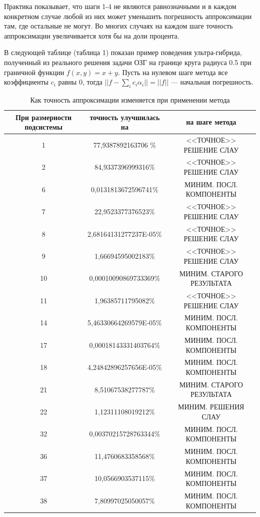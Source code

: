 \documentclass[a4paper, 12pt]{article}
\begin{document}
Практика показывает, что шаги 1-4 не являются равнозначными и в каждом конкретном случае любой из них может уменьшить погрешность аппроксимации там, где остальные не могут.
Во многих случаях на каждом шаге точность аппроксимации увеличивается хотя бы на доли процента.

В следующей таблице (таблица 1) показан пример поведения ультра-гибрида, полученный из реального решения задачи ОЗГ на границе круга радиуса 0.5 при граничной функции $f(x,y)=x+y$.
Пусть на нулевом шаге метода все коэффициенты $c_i$ равны 0, тогда $||f-\sum_i c_i \alpha_i||=||f||$ --- начальная погрешность.

\begin{table}[h]
 
  \label{tabl}
  \caption{Как точность аппроксимации изменяется при применении метода}
\begin{center}
\begin{tabular}[t]{|c|c|c|}
  \hline
  При размерности подсистемы & точность улучшилась на & на шаге метода \\
  \hline
  1 & 77,9387892163706 \% & <<ТОЧНОЕ>> РЕШЕНИЕ СЛАУ \\
  2 & 84,9337396999316\% & <<ТОЧНОЕ>> РЕШЕНИЕ СЛАУ\\
6& 0,0131813672596741\% &МИНИМ. ПОСЛ. КОМПОНЕНТЫ\\
7& 22,9523377376523\% &<<ТОЧНОЕ>> РЕШЕНИЕ СЛАУ\\
8& 2,68164131277237E-05\% &<<ТОЧНОЕ>> РЕШЕНИЕ СЛАУ \\
9& 1,66694595002183\% &<<ТОЧНОЕ>> РЕШЕНИЕ СЛАУ \\
10& 0,00010090869733369\% & МИНИМ. СТАРОГО РЕЗУЛЬТАТА\\
11& 1,96385711795082\% & <<ТОЧНОЕ>> РЕШЕНИЕ СЛАУ\\
14&  5,46330664269579E-05\% &МИНИМ. ПОСЛ. КОМПОНЕНТЫ\\
17& 0,00018143331403764\% & МИНИМ. ПОСЛ. КОМПОНЕНТЫ\\
18& 4,24842896257656E-05\% &МИНИМ. ПОСЛ. КОМПОНЕНТЫ\\
21& 8,51067538277787\% & МИНИМ. СТАРОГО РЕЗУЛЬТАТА \\
22& 1,12311108019212\% & МИНИМ. РЕШЕНИЯ СЛАУ\\
32&  0,00370215728763344\% & МИНИМ. ПОСЛ. КОМПОНЕНТЫ\\
36& 11,4760683358568\% & МИНИМ. ПОСЛ. КОМПОНЕНТЫ \\
37& 10,0566903537115\% & МИНИМ. ПОСЛ. КОМПОНЕНТЫ\\
38& 7,80997025050057\% &МИНИМ. ПОСЛ. КОМПОНЕНТЫ \\

\end{tabular}
\end{center}
\end{table}
\end{document}
